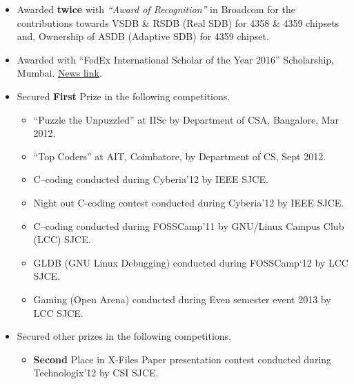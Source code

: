 \documentclass[a4paper, 10pt]{extarticle}
\begin{document}
\begin{large}
\begin{itemize}
    
    \item{Awarded \textbf{twice} with \textit{``Award of Recognition''} in Broadcom for the contributions towards VSDB \& RSDB (Real SDB) for 4358 \& 4359 chipsets and, Ownership of ASDB (Adaptive SDB) for 4359 chipset.}

    
    \item{Awarded with ``FedEx International Scholar of the Year 2016'' Scholarship, Mumbai. \href{https://www.linkedin.com/pulse/bangalore-student-wins-fedex-scholarship-edu-beanz}{News link}.}

    
    \item{Secured \textbf{First} Prize in the following competitions.
        \vspace{-0.2cm}
        \begin{itemize}
            \item{``Puzzle the Unpuzzled'' at IISc by Department of CSA, Bangalore, Mar 2012.}
           
            \item{``Top Coders'' at AIT, Coimbatore, by Department of CS, Sept 2012.}
            
            \item{C--coding conducted during Cyberia'12 by IEEE SJCE.}
            
            \item{Night out C-coding contest conducted during Cyberia'12 by IEEE SJCE.}
                        
            \item{C--coding conducted during FOSSCamp'11 by GNU/Linux Campus Club (LCC) SJCE.}
            
            \item{GLDB (GNU Linux Debugging) conducted during FOSSCamp`12 by LCC SJCE.}
            
            \item{Gaming (Open Arena) conducted during Even semester event 2013 by LCC SJCE.}
        \end{itemize}
    }
       
    \item{Secured other prizes in the following competitions.
        \vspace{-0.2cm}
        \begin{itemize}
            \setlength\itemsep{0.05cm}
            \item{\textbf{Second} Place in X-Files Paper presentation contest conducted during Technologix'12 by CSI SJCE.}
            

\end{itemize}}
\end{itemize}
\end{large}
\end{document}
